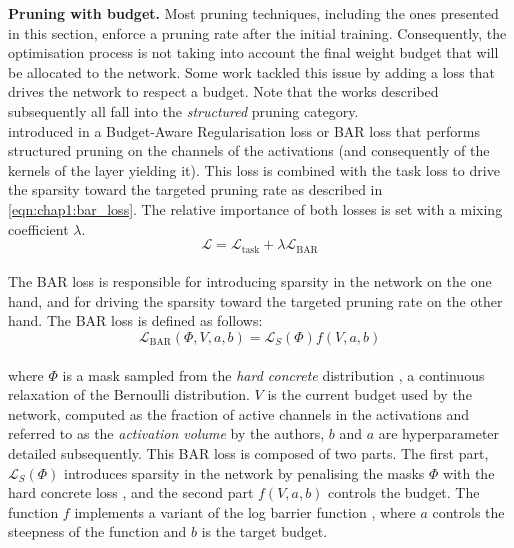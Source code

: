 \noindent \textbf{Pruning with budget.} Most pruning techniques, including the
ones presented in this section, enforce a pruning rate after the initial
training. Consequently, the optimisation process is not taking into account the
final weight budget that will be allocated to the network. Some work tackled
this issue by adding a loss that drives the network to respect a budget. Note
that the works described subsequently all fall into the \emph{structured}
pruning category.\\ 

\citeauthor{lemaire2019structured} introduced in \cite{lemaire2019structured} a
Budget-Aware Regularisation loss or BAR loss that performs structured pruning on
the channels of the activations (and consequently of the kernels of the layer
yielding it). This loss is combined with the task loss to drive the sparsity
toward the targeted pruning rate as described in \cref{eqn:chap1:bar_loss}. The
relative importance of both losses is set with a mixing coefficient $\lambda$.\\

\begin{equation}
  \label{eqn:chap1:bar_loss}
  \mathcal{L} = \mathcal{L}_{\text{task}} + \lambda \mathcal{L}_{\text{BAR}}
\end{equation}\\

\noindent The BAR loss is responsible for introducing sparsity in the network on the
one hand, and for driving the sparsity toward the targeted pruning rate on the
other hand. The BAR loss is defined as follows:\\ 

\begin{equation}
  \mathcal{L}_{\text{BAR}}(\Phi,V,a,b) = \mathcal{L}_S(\Phi)f(V,a,b)
\end{equation}\\

\noindent where $\Phi$ is a mask sampled from the \emph{hard concrete}
distribution \cite{louizos2017learning}, a continuous relaxation of the
Bernoulli distribution. $V$ is the current budget used by the network, computed
as the fraction of active channels in the activations and referred to as the
\emph{activation volume} by the authors, $b$ and $a$ are hyperparameter detailed
subsequently. This BAR loss is composed of two parts. The first part,
$\mathcal{L}_S(\Phi)$ introduces sparsity in the network by penalising the masks
$\Phi$ with the hard concrete loss \cite{louizos2017learning}, and the second
part $f(V,a,b)$ controls the budget. The function $f$ implements a variant of
the log barrier function \cite{boyd2004convex}, where $a$ controls the steepness
of the function and $b$ is the target budget.\\


